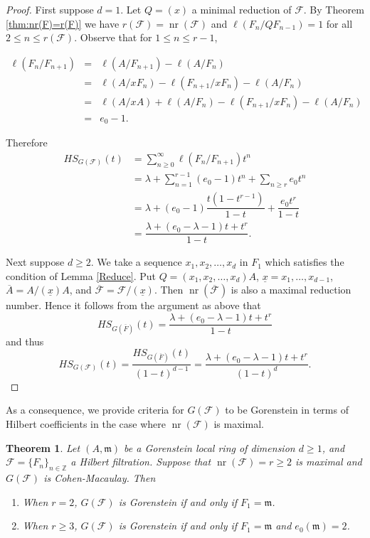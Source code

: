 \documentclass[12pt]{amsart}
\newtheorem{thm}{Theorem}[section]
\theoremstyle{definition}
\theoremstyle{remark}
\numberwithin{equation}{section}
\newcommand{\m}{{\mathfrak m}}
\DeclareMathOperator{\nr}{{nr}}
\newcommand{\FF}{\mathcal{F}}
\begin{document}
\begin{proof}
First suppose $d=1$. 
Let $Q=(x)$  a minimal reduction of  $\FF$.  
By Theorem \ref{thm:nr(F)=r(F)} we have ${r}(\FF)=\nr(\FF)$ and $\ell({F_n}/Q{F_{n-1}})=1$ for all $2\leq n \leq {r}(\FF)$.
Observe that for $1\leq n \leq r-1$,  
         
\begin{eqnarray*}
\ell\left( {F_n}/{F_{n+1}} \right)&=&\ell(A/F_{n+1})-\ell(A/F_n) \nonumber\\
&=&\ell \left( A/x {F_n} \right)-\ell \left( {F_{n+1}}/x{F_n} \right) -
\ell \left( A/ {F_n} \right)   \nonumber\\
&=& \ell \left( A/xA \right)+\ell\left( A/{F_n} \right)
-\ell\left( {F_{n+1}}/x{F_n} \right)-\ell\left(A/{F_n}\right) \\ 
&=& e_0-1.  
\end{eqnarray*}

Therefore
\begin{align*}
HS_{{G}(\FF)}(t)
& =\sum_{n \ge 0}^{\infty}\ell({F_n}/{F_{n+1}})t^n \\
&=\lambda +\sum_{n= 1}^{r-1} (e_0-1) t^n
+\sum_{n\geq r} e_0 t^n \\[1mm]
&= \lambda + (e_0-1)\dfrac{t(1-t^{r-1})}{1-t} + \dfrac{e_0t^r}{1-t}  \\[1mm]
&=\dfrac{\lambda+(e_0-\lambda-1)t+t^r}{1-t}. 
\end{align*}


\par \vspace{2mm}
Next suppose $d \ge 2$. 
We take a sequence $x_1,x_2,\ldots,x_d$ in $F_1$ which satisfies 
the condition of Lemma \ref{Reduce}.  
Put $Q=(x_1,x_2,\ldots,x_d)A$, $\underline{x}=x_1,\ldots,x_{d-1}$, 
$\overline{A}=A/(\underline{x})A$, and $\overline{\FF}=\FF/(\underline{x})$. 
Then  $\nr(\overline{\FF})$ is also a maximal reduction number. 
Hence it follows from the argument as above that 
\[
HS_{G(\overline{F})}(t)=\dfrac{\lambda+(e_0-\lambda-1)t+t^r}{1-t} 
\]
and thus 
\[
HS_{G(\FF)}(t) =\dfrac{HS_{G(\overline{F})}(t)}{(1-t)^{d-1}}=
\dfrac{\lambda+(e_0-\lambda-1)t+t^r}{(1-t)^d}.  
\]
\end{proof}

\par 
As a consequence, we provide criteria for $G(\FF)$ to be Gorenstein 
in terms of Hilbert coefficients in the case where $\nr(\FF)$ is maximal. 

\begin{thm}\label{thm:GorMaximal}
Let $(A, \m) $ be a Gorenstein local ring of dimension $d \ge 1$,  
and $\FF =  \{{F_n}\}_{n\in \mathbb{Z}}$ a Hilbert filtration. 
Suppose that $\nr(\FF) =r \geq 2$ is maximal and 
$G(\FF)$ is Cohen-Macaulay. 
Then  
\begin{enumerate}
\item[\rm{(a)}] When $r =2$, 
$G(\FF)$ is Gorenstein if and only if $F_1 = \m$. 
\item[\rm{(b)}] When $r \ge 3$, 
$G(\FF)$ is Gorenstein if and only if $F_1 = \m$  and $e_0(\m) = 2$.
\end{enumerate}
\end{thm}
\end{document}

